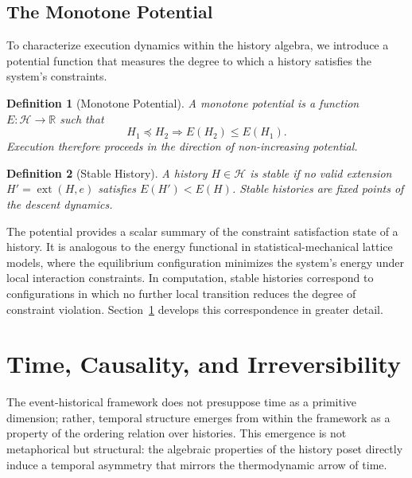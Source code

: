 \documentclass[12pt]{article}
\newtheorem{definition}{Definition}
\begin{document}
\subsection{The Monotone Potential}

To characterize execution dynamics within the history algebra, we introduce a potential function that measures the degree to which a history satisfies the system's constraints.

\begin{definition}[Monotone Potential]
A \emph{monotone potential} is a function $E : \mathcal{H} \rightarrow \mathbb{R}$ such that
\[
H_1 \preceq H_2 \Rightarrow E(H_2) \leq E(H_1).
\]
Execution therefore proceeds in the direction of non-increasing potential.
\end{definition}

\begin{definition}[Stable History]
A history $H \in \mathcal{H}$ is \emph{stable} if no valid extension $H' = \operatorname{ext}(H, e)$ satisfies $E(H') < E(H)$. Stable histories are fixed points of the descent dynamics.
\end{definition}

The potential provides a scalar summary of the constraint satisfaction state of a history. It is analogous to the energy functional in statistical-mechanical lattice models, where the equilibrium configuration minimizes the system's energy under local interaction constraints. In computation, stable histories correspond to configurations in which no further local transition reduces the degree of constraint violation. Section~\ref{sec:time} develops this correspondence in greater detail.


\section{Time, Causality, and Irreversibility}
\label{sec:time}

The event-historical framework does not presuppose time as a primitive dimension; rather, temporal structure emerges from within the framework as a property of the ordering relation over histories. This emergence is not metaphorical but structural: the algebraic properties of the history poset directly induce a temporal asymmetry that mirrors the thermodynamic arrow of time.
\end{document}
